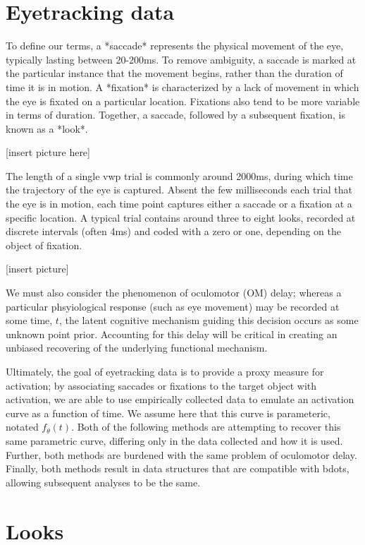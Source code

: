 \documentclass{article}
\begin{document}
\section{Eyetracking data} 

To define our terms, a *saccade* represents the physical movement of the eye, typically lasting between 20-200ms. To remove ambiguity, a saccade is marked at the particular instance that the movement begins, rather than the duration of time it is in motion. A *fixation* is characterized by a lack of movement in which the eye is fixated on a particular location. Fixations also tend to be more variable in terms of duration. Together, a saccade, followed by a subsequent fixation, is known as a *look*.

[insert picture here]

The length of a single vwp trial is commonly around 2000ms, during which time the trajectory of the eye is captured. Absent the few milliseconds each trial that the eye is in motion, each time point captures either a saccade or a fixation at a specific location. A typical trial contains around three to eight looks, recorded at discrete intervals (often 4ms) and coded with a zero or one, depending on the object of fixation.

[insert picture]


We must also consider the phenomenon of oculomotor (OM) delay; whereas a particular phsyiological response (such as eye movement) may be recorded at some time, $t$, the latent cognitive mechanism guiding this decision occurs as some unknown point prior. Accounting for this delay will be critical in creating an unbiased recovering of the underlying functional mechanism.

Ultimately, the goal of eyetracking data is to provide a proxy measure for activation; by associating saccades or fixations to the target object with activation, we are able to use empirically collected data to emulate an activation curve as a function of time. We assume here that this curve is parameteric, notated $f_{\theta}(t)$. Both of the following methods are attempting to recover this same parametric curve, differing only in the data collected and how it is used. Further, both methods are burdened with the same problem of oculomotor delay. Finally, both methods result in data structures that are compatible with bdots, allowing subsequent analyses to be the same.

\section{Looks}
\end{document}
